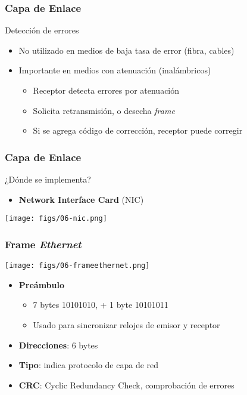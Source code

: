 \documentclass[letter]{beamer}
\begin{document}
\begin{frame}
  \frametitle{Capa de Enlace}

  Detección de errores
  \begin{itemize}
    \item No utilizado en medios de baja tasa de error (fibra, cables)
    \item Importante en medios con atenuación (inalámbricos)
      \begin{itemize}
        \item Receptor detecta errores por atenuación 
        \item Solicita retransmisión, o desecha {\em frame}
        \item Si se agrega código de corrección, receptor puede corregir
      \end{itemize}
  \end{itemize}

\end{frame}
\begin{frame}
  \frametitle{Capa de Enlace}

  ¿Dónde se implementa?
  
  \begin{itemize}
    \item {\bf Network Interface Card} (NIC)
  \end{itemize}

  \begin{center}
    \texttt{[image: figs/06-nic.png]}
  \end{center}

\end{frame}

\begin{frame}
  \frametitle{Frame {\em Ethernet}}

  \begin{center}
    \texttt{[image: figs/06-frameethernet.png]}
  \end{center}

  \begin{itemize}
    \item {\bf Preámbulo}
      \begin{itemize}
        \item 7 bytes 10101010, + 1 byte 10101011
        \item Usado para sincronizar relojes de emisor y receptor
      \end{itemize}
    \item {\bf Direcciones}: 6 bytes
    \item {\bf Tipo}: indica protocolo de capa de red
    \item {\bf CRC}: Cyclic Redundancy Check, comprobación de errores
  \end{itemize}
  
\end{frame}
\end{document}
